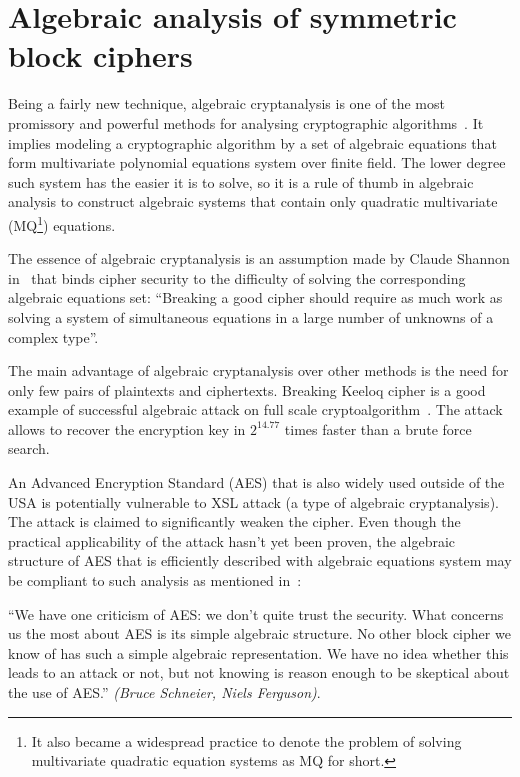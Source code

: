 

\chapter{Algebraic analysis of symmetric block ciphers}
\label{sec:algebraic}

Being a fairly new technique, algebraic cryptanalysis is one of the most
promissory and powerful methods for analysing cryptographic
algorithms~\cite{Albrecht2010}. It implies modeling a cryptographic algorithm
by a set of algebraic equations that form multivariate polynomial equations
system over finite field. The lower degree such system has the easier it is to
solve, so it is a rule of thumb in algebraic analysis to construct algebraic
systems that contain only quadratic multivariate
(MQ\footnote{It also became a widespread practice to denote the problem of
solving multivariate quadratic equation systems as MQ for short.})
equations.

The essence of algebraic cryptanalysis is an assumption made by Claude Shannon
in~\cite{shannon:secrecy} that binds cipher security to the difficulty of
solving the corresponding algebraic equations set:
``Breaking a good cipher should require as much work as solving a system of
simultaneous equations in a large number of unknowns of a complex
type''.

The main advantage of algebraic cryptanalysis over other methods is the need
for only few pairs of plaintexts and ciphertexts. Breaking Keeloq cipher is
a good example of successful algebraic attack on full scale
cryptoalgorithm~\cite{bard2009algebraic}. The attack allows to recover the
encryption key in $2^{14.77}$ times faster than a brute force search.

An Advanced Encryption Standard (AES) that is also widely used outside of the
USA is potentially vulnerable to XSL attack (a type of algebraic cryptanalysis).
The attack is claimed to significantly weaken the cipher. Even though the
practical applicability of the attack hasn't yet been proven, the algebraic
structure of AES that is efficiently described with algebraic equations system
may be compliant to such analysis as mentioned in~\cite{ferguson2003practical}:

``We have one criticism of AES: we don't quite trust the security. What concerns
us the most about AES is its simple algebraic structure. No other block cipher
we know of has such a simple algebraic representation. We have no idea whether
this leads to an attack or not, but not knowing is reason enough to be skeptical
about the use of AES.'' \textit{(Bruce Schneier, Niels Ferguson)}.

